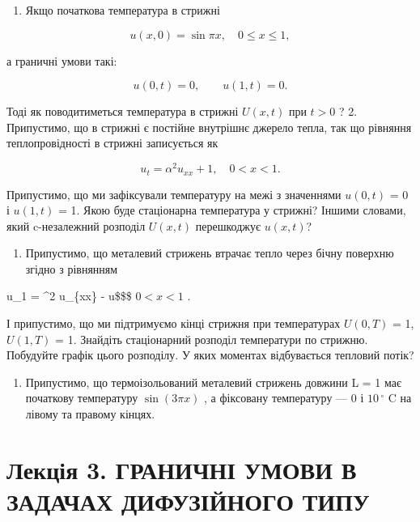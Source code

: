 \documentclass[
  ukrainian,
]{article}
\providecommand{\tightlist}{%
  \setlength{\itemsep}{0pt}\setlength{\parskip}{0pt}}
\begin{document}
\begin{enumerate}
\def\labelenumi{\arabic{enumi}.}
\tightlist
\item
  Якщо початкова температура в стрижні
\end{enumerate}

\[
u(x, 0) = \sin \pi x, \quad 0 \leqslant x \leqslant 1,
\]

а граничні умови такі:

\[
u(0, t) = 0, \qquad u(1, t) = 0.
\]

Тоді як поводитиметься температура в стрижні \(U(x, t)\) при \(t > 0\) ?
2. Припустимо, що в стрижні є постійне внутрішнє джерело тепла, так що
рівняння теплопровідності в стрижні записується як

\[
u_t = \alpha^2 u_{xx} + 1, \quad 0 < x < 1.
\]

Припустимо, що ми зафіксували температуру на межі з значеннями
\(u(0, t)\) = 0 і \(u(1, t)\) = 1. Якою буде стаціонарна температура у
стрижні? Іншими словами, який c-незалежний розподіл \(U(x, t)\)
перешкоджує \(u(x, t)\)?

\begin{enumerate}
\def\labelenumi{\arabic{enumi}.}
\setcounter{enumi}{2}
\tightlist
\item
  Припустимо, що металевий стрижень втрачає тепло через бічну поверхню
  згідно з рівнянням
\end{enumerate}

u\_1 = \alpha\^{}2 u\_\{xx\} - \beta u\$\$\$ \(0 < x < 1\) .

І припустимо, що ми підтримуємо кінці стрижня при температурах
\(U(0, T)\) = 1, \(U(1, T)\) = 1. Знайдіть стаціонарний розподіл
температури по стрижню. Побудуйте графік цього розподілу. У яких
моментах відбувається тепловий потік?

\begin{enumerate}
\def\labelenumi{\arabic{enumi}.}
\setcounter{enumi}{3}
\tightlist
\item
  Припустимо, що термоізольований металевий стрижень довжини L = 1 має
  початкову температуру \(\sin(3\pi x)\) , а фіксовану температуру --- 0
  і \(10\,^{\circ}\) C на лівому та правому кінцях.
\end{enumerate}

\section{Лекція 3. ГРАНИЧНІ УМОВИ В ЗАДАЧАХ ДИФУЗІЙНОГО
ТИПУ}\label{ux43bux435ux43aux446ux456ux44f-3.-ux433ux440ux430ux43dux438ux447ux43dux456-ux443ux43cux43eux432ux438-ux432-ux437ux430ux434ux430ux447ux430ux445-ux434ux438ux444ux443ux437ux456ux439ux43dux43eux433ux43e-ux442ux438ux43fux443}
\end{document}
